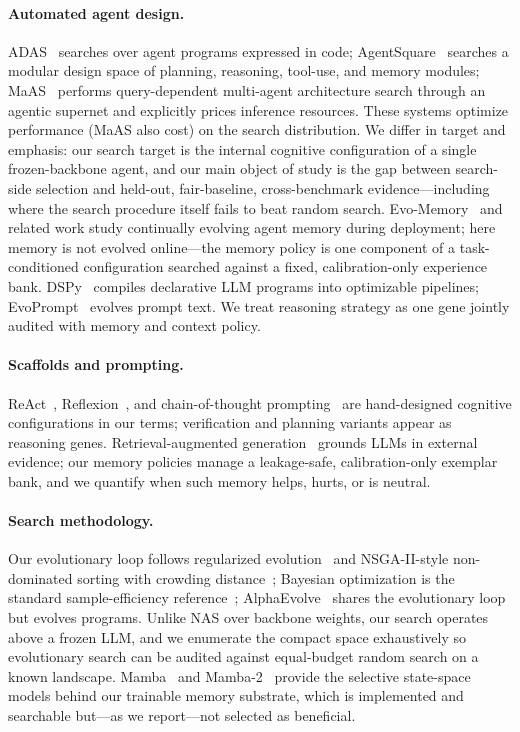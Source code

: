 \documentclass[11pt]{article}
\begin{document}
\paragraph{Automated agent design.} ADAS~\citep{hu2024adas} searches over
agent programs expressed in code; AgentSquare~\citep{shang2025agentsquare}
searches a modular design space of planning, reasoning, tool-use, and
memory modules; MaAS~\citep{zhang2025maas} performs query-dependent
multi-agent architecture search through an agentic supernet and explicitly
prices inference resources. These systems optimize performance (MaAS also
cost) on the search distribution. We differ in target and emphasis: our
search target is the internal cognitive configuration of a single
frozen-backbone agent, and our main object of study is the gap between
search-side selection and held-out, fair-baseline, cross-benchmark
evidence---including where the search procedure itself fails to beat random
search. Evo-Memory~\citep{wei2025evomemory} and related work study
continually evolving agent memory during deployment; here memory is not
evolved online---the memory policy is one component of a task-conditioned
configuration searched against a fixed, calibration-only experience bank.
DSPy~\citep{khattab2023dspy} compiles declarative LLM programs into
optimizable pipelines; EvoPrompt~\citep{guo2024evoprompt} evolves prompt
text. We treat reasoning strategy as one gene jointly audited with memory
and context policy.

\paragraph{Scaffolds and prompting.} ReAct~\citep{yao2023react},
Reflexion~\citep{shinn2023reflexion}, and chain-of-thought
prompting~\citep{wei2022cot} are hand-designed cognitive configurations in
our terms; verification and planning variants appear as reasoning genes.
Retrieval-augmented generation~\citep{lewis2020rag} grounds LLMs in
external evidence; our memory policies manage a leakage-safe,
calibration-only exemplar bank, and we quantify when such memory helps,
hurts, or is neutral.

\paragraph{Search methodology.} Our evolutionary loop follows regularized
evolution~\citep{real2019ameoba} and NSGA-II-style non-dominated sorting
with crowding distance~\citep{deb2002nsga2}; Bayesian optimization is the
standard sample-efficiency reference~\citep{snoek2012bayesopt};
AlphaEvolve~\citep{alphaevolve2025} shares the evolutionary loop but
evolves programs. Unlike NAS over backbone weights, our search operates
above a frozen LLM, and we enumerate the compact space exhaustively so
evolutionary search can be audited against equal-budget random search on a
known landscape. Mamba~\citep{gu2023mamba} and
Mamba-2~\citep{dao2024mamba2} provide the selective state-space models
behind our trainable memory substrate, which is implemented and searchable
but---as we report---not selected as beneficial.
\end{document}
